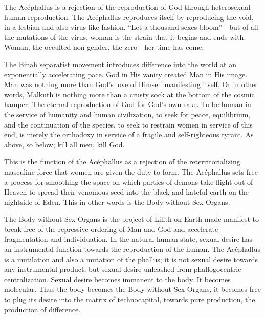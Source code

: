 \documentclass[10pt, statementpaper, twoside, openright]{memoir}
\begin{document}
The Acéphallus is a rejection of the reproduction of God through heterosexual human reproduction. The Acéphallus reproduces itself by reproducing the void, in a lesbian and also virus-like fashion. ``Let a thousand sexes bloom''---but of all the mutations of the virus, woman is the strain that it begins and ends with. Woman, the occulted non-gender, the zero---her time has come.

The Binah separatist movement introduces difference into the world at an exponentially accelerating pace. God in His vanity created Man in His image. Man was nothing more than God's love of Himself manifesting itself. Or in other words, Malkuth is nothing more than a crusty sock at the bottom of the cosmic hamper. The eternal reproduction of God for God's own sake. To be human in the service of humanity and human civilization, to seek for peace, equilibrium, and the continuation of the species, to seek to restrain women in service of this end, is merely the orthodoxy in service of a fragile and self-righteous tyrant. As above, so below; kill all men, kill God.

This is the function of the Acéphallus as a rejection of the reterritorializing masculine force that women are given the duty to form. The Acéphallus sets free a process for smoothing the space on which parties of demons take flight out of Heaven to spread their venomous seed into the black and hateful earth on the nightside of Eden. This in other words is the Body without Sex Organs.

The Body without Sex Organs is the project of Lilith on Earth made manifest to break free of the repressive ordering of Man and God and accelerate fragmentation and individuation. In the natural human state, sexual desire has an instrumental function towards the reproduction of the human. The Acéphallus is a mutilation and also a mutation of the phallus; it is not sexual desire towards any instrumental product, but sexual desire unleashed from phallogocentric centralization. Sexual desire becomes immanent to the body. It becomes molecular. Thus the body becomes the Body without Sex Organs, it becomes free to plug its desire into the matrix of technocapital, towards pure production, the production of difference.
\end{document}
